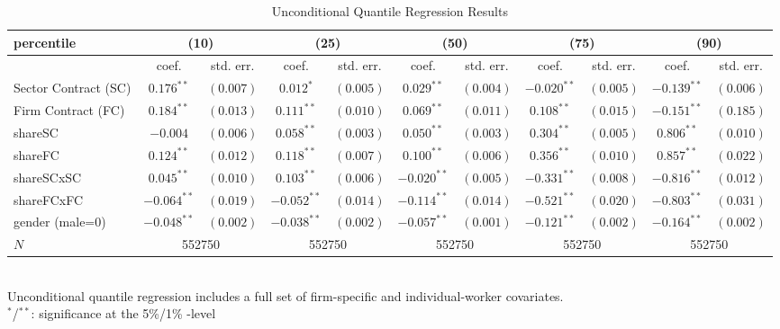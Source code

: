 \begin{landscape}
\begin{table}[]
\scriptsize
\centering
\caption{Unconditional Quantile Regression Results}
\label{UQR}
\begin{tabular}{l|cccccccccc}
 percentile & \multicolumn{2}{c}{(10)} & \multicolumn{2}{c}{(25)} & \multicolumn{2}{c}{(50)} & \multicolumn{2}{c}{(75)} & \multicolumn{2}{c}{(90)}\\
\hline
 & coef. & std. err. & coef. & std. err. & coef. & std. err. & coef. & std. err. & coef. & std. err. \\
\hline
Sector Contract (SC)    & $0.176^{**}$ & $(0.007)$ & $0.012^{*}$ & $(0.005)$ & $0.029^{**}$ & $(0.004)$ & $-0.020^{**}$ & $(0.005)$ & $-0.139^{**}$ & $(0.006)$\\
Firm Contract (FC)      & $0.184^{**}$ & $(0.013)$ & $0.111^{**}$ & $(0.010)$ & $0.069^{**}$ & $(0.011)$ & $0.108^{**}$ & $(0.015)$ & $-0.151^{**}$ & $(0.185)$\\
shareSC                 & $-0.004$ & $(0.006)$ & $0.058^{**}$ & $(0.003)$ & $0.050^{**}$ & $(0.003)$ & $0.304^{**}$ & $(0.005)$ & $0.806^{**}$ & $(0.010)$\\
shareFC                 & $0.124^{**}$ & $(0.012)$ & $0.118^{**}$ & $(0.007)$ & $0.100^{**}$ & $(0.006)$ & $0.356^{**}$ & $(0.010)$ & $0.857^{**}$ & $(0.022)$\\
shareSCxSC              & $0.045^{**}$ & $(0.010)$ & $0.103^{**}$ & $(0.006)$ & $-0.020^{**}$ & $(0.005)$ & $-0.331^{**}$ & $(0.008)$ & $-0.816^{**}$ & $(0.012)$\\
shareFCxFC              & $-0.064^{**}$ & $(0.019)$ & $-0.052^{**}$ & $(0.014)$ & $-0.114^{**}$ & $(0.014)$ & $-0.521^{**}$ & $(0.020)$ & $-0.803^{**}$ & $(0.031)$\\
gender (male=0)         & $-0.048^{**}$ & $(0.002)$ & $-0.038^{**}$ & $(0.002)$ & $-0.057^{**}$ & $(0.001)$ & $-0.121^{**}$ & $(0.002)$  & $-0.164^{**}$ & $(0.002)$\\
\hline
$N$                     & \multicolumn{2}{c}{552750} & \multicolumn{2}{c}{552750} & \multicolumn{2}{c}{552750} & \multicolumn{2}{c}{552750} & \multicolumn{2}{c}{552750} \\
\hline
\end{tabular}\\
\bigskip
Unconditional quantile regression includes a full set of firm-specific and individual-worker covariates.\\
$^{*}$/$^{**}$: significance at the 5\%/1\% -level
\end{table}
\end{landscape}
